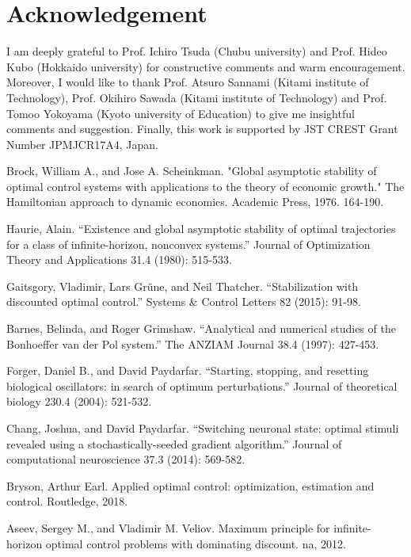 \documentclass[11pt,reqno]{amsart}
\begin{document}
\section*{Acknowledgement}
I am deeply grateful to Prof. Ichiro Tsuda (Chubu university) and Prof. Hideo Kubo (Hokkaido university) for constructive comments and warm encouragement. Moreover, I would like to thank Prof. Atsuro Sannami (Kitami institute of Technology), Prof. Okihiro Sawada (Kitami institute of Technology) and Prof. Tomoo Yokoyama (Kyoto university of Education) to give me insightful comments and suggestion. Finally, this work is supported by JST CREST Grant Number JPMJCR17A4, Japan.

\begin{thebibliography}{99}

Brock, William A., and Jose A. Scheinkman. "Global asymptotic stability of optimal control systems with applications to the theory of economic growth." The Hamiltonian approach to dynamic economics. Academic Press, 1976. 164-190.

Haurie, Alain. ``Existence and global asymptotic stability of optimal trajectories for a class of infinite-horizon, nonconvex systems.'' Journal of Optimization Theory and Applications 31.4 (1980): 515-533.


Gaitsgory, Vladimir, Lars Gr\"{u}ne, and Neil Thatcher. ``Stabilization with discounted optimal control.'' Systems \& Control Letters 82 (2015): 91-98.

Barnes, Belinda, and Roger Grimshaw. ``Analytical and numerical studies of the Bonhoeffer van der Pol system.'' The ANZIAM Journal 38.4 (1997): 427-453.

Forger, Daniel B., and David Paydarfar. ``Starting, stopping, and resetting biological oscillators: in search of optimum perturbations.'' Journal of theoretical biology 230.4 (2004): 521-532.

Chang, Joshua, and David Paydarfar. ``Switching neuronal state: optimal stimuli revealed using a stochastically-seeded gradient algorithm.'' Journal of computational neuroscience 37.3 (2014): 569-582.

Bryson, Arthur Earl. Applied optimal control: optimization, estimation and control. Routledge, 2018.


Aseev, Sergey M., and Vladimir M. Veliov. Maximum principle for infinite-horizon optimal control problems with dominating discount. na, 2012.


\end{thebibliography}
\end{document}
